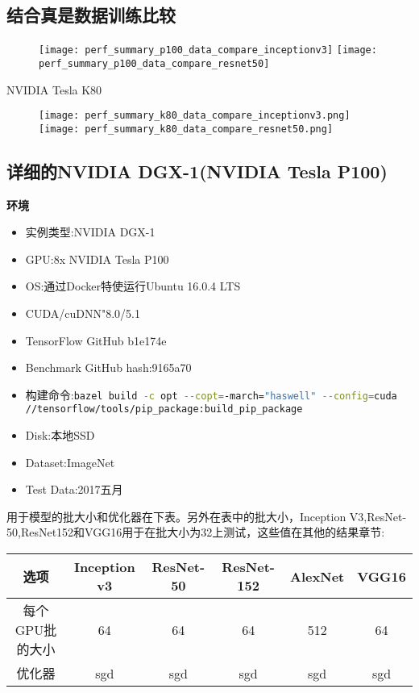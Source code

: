 \subsection{结合真是数据训练比较}
\centering
\begin{figure}[H]
	\texttt{[image: perf\_summary\_p100\_data\_compare\_inceptionv3]}
	\texttt{[image: perf\_summary\_p100\_data\_compare\_resnet50]}
\end{figure}
NVIDIA Tesla K80
\begin{figure}[H]
	\centering
	\texttt{[image: perf\_summary\_k80\_data\_compare\_inceptionv3.png]}
	\texttt{[image: perf\_summary\_k80\_data\_compare\_resnet50.png]}
\end{figure}
\subsection{详细的NVIDIA DGX-1(NVIDIA Tesla P100)}
\textbf{环境}\newline
\begin{itemize}
	\item 实例类型:NVIDIA DGX-1
	\item GPU:8x NVIDIA Tesla P100
	\item OS:通过Docker特使运行Ubuntu 16.0.4 LTS 
	\item CUDA/cuDNN"8.0/5.1
	\item TensorFlow GitHub b1e174e
	\item Benchmark GitHub hash:9165a70
	\item 构建命令:\lstinline[language=Bash]{bazel build -c opt --copt=-march="haswell" --config=cuda //tensorflow/tools/pip_package:build_pip_package}
	\item Disk:本地SSD
	\item Dataset:ImageNet
	\item Test Data:2017五月
\end{itemize}
用于模型的批大小和优化器在下表。另外在表中的批大小，Inception V3,ResNet-50,ResNet152和VGG16用于在批大小为32上测试，这些值在其他的结果章节:
\begin{table}[H]
	\centering
	\begin{tabular}{|c|c|c|c|c|c|}
		\hline
		选项&Inception v3&ResNet-50&ResNet-152&AlexNet&VGG16\\
		\hline
		每个GPU批的大小&64&64&64&512&64\\
		\hline
		优化器&sgd&sgd&sgd&sgd&sgd\\
		\hline
	\end{tabular}
\end{table}
